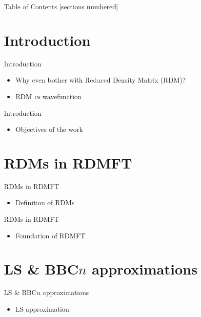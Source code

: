 \begin{frame}{}
\titlepage
\end{frame}

\begin{frame}{Table of Contents}
    [sections numbered]
    \tableofcontents
\end{frame}

\renewcommand{\sec}{Introduction}
\section{\sec}

\begin{frame}{\sec}
    \begin{itemize}
        \item Why even bother with Reduced Density Matrix (RDM)?
        \item RDM \textit{vs} wavefunction 
    \end{itemize}
\end{frame}

\begin{frame}{\sec}
    \begin{itemize}
        \item Objectives of the work
    \end{itemize}
\end{frame}

\renewcommand{\sec}{RDMs in RDMFT}
\section{\sec}
\begin{frame}{\sec}
    \begin{itemize}
        \item Definition of RDMs
    \end{itemize}
\end{frame}

\begin{frame}{\sec}
    \begin{itemize}
        \item Foundation of RDMFT
    \end{itemize}
\end{frame}

\renewcommand{\sec}{LS \& BBC$n$ approximations}
\section{\sec}
\begin{frame}{\sec}
    \begin{itemize}
        \item LS approximation
    \end{itemize}
\end{frame}

